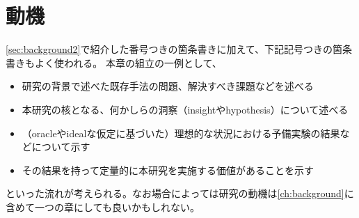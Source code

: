 \chapter{動機}\label{ch:motivation}

\cref{sec:background2}で紹介した番号つきの箇条書きに加えて、下記記号つきの箇条書きもよく使われる。
本章の組立の一例として、
\begin{itemize}
  \item 研究の背景で述べた既存手法の問題、解決すべき課題などを述べる
  \item 本研究の核となる、何かしらの洞察（insightやhypothesis）について述べる
  \item （oracleやidealな仮定に基づいた）理想的な状況における予備実験の結果などについて示す
  \item その結果を持って定量的に本研究を実施する価値があることを示す
\end{itemize}
といった流れが考えられる。なお場合によっては研究の動機は\cref{ch:background}に含めて一つの章にしても良いかもしれない。